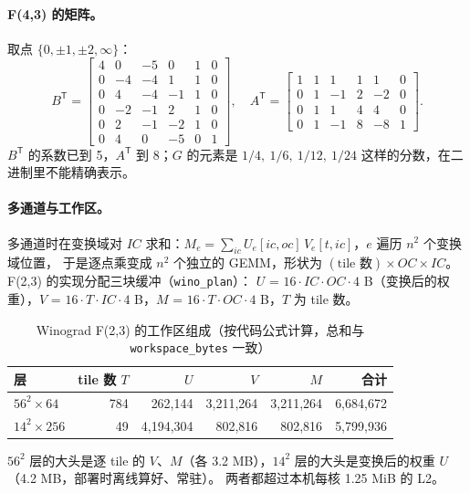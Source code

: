 \documentclass[11pt,a4paper]{ctexart}
\begin{document}
\paragraph{F(4,3) 的矩阵。} 取点 $\{0,\pm1,\pm2,\infty\}$：
\[
B^{\mathsf T} = \begin{bmatrix} 4 & 0 & -5 & 0 & 1 & 0\\ 0 & -4 & -4 & 1 & 1 & 0\\ 0 & 4 & -4 & -1 & 1 & 0\\ 0 & -2 & -1 & 2 & 1 & 0\\ 0 & 2 & -1 & -2 & 1 & 0\\ 0 & 4 & 0 & -5 & 0 & 1\end{bmatrix},\quad
A^{\mathsf T} = \begin{bmatrix} 1 & 1 & 1 & 1 & 1 & 0\\ 0 & 1 & -1 & 2 & -2 & 0\\ 0 & 1 & 1 & 4 & 4 & 0\\ 0 & 1 & -1 & 8 & -8 & 1\end{bmatrix}.
\]
$B^{\mathsf T}$ 的系数已到 5，$A^{\mathsf T}$ 到 8；$G$ 的元素是 $1/4,\ 1/6,\ 1/12,\ 1/24$ 这样的分数，在二进制里不能精确表示。

\paragraph{多通道与工作区。} 多通道时在变换域对 $IC$ 求和：$M_e = \sum_{ic} U_e[ic,oc]\,V_e[t,ic]$，$e$ 遍历 $n^2$ 个变换域位置，
于是逐点乘变成 $n^2$ 个独立的 GEMM，形状为 $(\text{tile 数})\times OC\times IC$。F(2,3) 的实现分配三块缓冲（\texttt{wino\_plan}）：
$U$ = $16\cdot IC\cdot OC\cdot4$ B（变换后的权重），$V$ = $16\cdot T\cdot IC\cdot4$ B，$M$ = $16\cdot T\cdot OC\cdot4$ B，$T$ 为 tile 数。

\begin{table}[H]
\centering\small
\caption{Winograd F(2,3) 的工作区组成（按代码公式计算，总和与 \texttt{workspace\_bytes} 一致）}\label{tab:winows}
\begin{tabular}{lrrrrr}
\toprule
层 & tile 数 $T$ & $U$ & $V$ & $M$ & 合计 \\
\midrule
$56^2\times64$ & 784 & 262,144 & 3,211,264 & 3,211,264 & 6,684,672 \\
$14^2\times256$ & 49 & 4,194,304 & 802,816 & 802,816 & 5,799,936 \\
\bottomrule
\end{tabular}
\end{table}

$56^2$ 层的大头是逐 tile 的 $V$、$M$（各 3.2 MB），$14^2$ 层的大头是变换后的权重 $U$（4.2 MB，部署时离线算好、常驻）。
两者都超过本机每核 1.25 MiB 的 L2。
\end{document}
